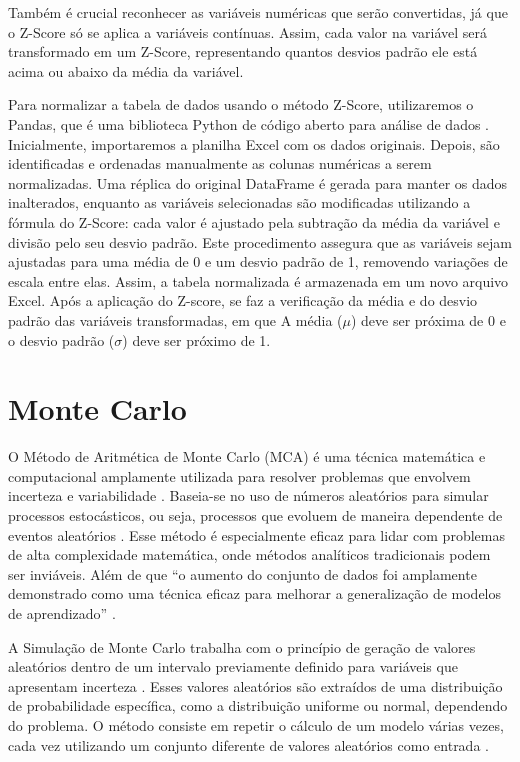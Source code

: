 \begin{apendicesenv}
Também é crucial reconhecer as variáveis numéricas que serão convertidas, já que o Z-Score só se aplica a variáveis contínuas. Assim, cada valor na variável será transformado em um Z-Score, representando quantos desvios padrão ele está acima ou abaixo da média da variável. 

Para normalizar a tabela de dados usando o método Z-Score, utilizaremos o  Pandas, que é uma biblioteca Python de código aberto para análise de dados \cite{chen2018}. Inicialmente, importaremos a planilha Excel com os dados originais. Depois, são identificadas e ordenadas manualmente as colunas numéricas a serem normalizadas. Uma réplica do original DataFrame é gerada para manter os dados inalterados, enquanto as variáveis selecionadas são modificadas utilizando a fórmula do Z-Score: cada valor é ajustado pela subtração da média da variável e divisão pelo seu desvio padrão. Este procedimento assegura que as variáveis sejam ajustadas para uma média de 0 e um desvio padrão de 1, removendo variações de escala entre elas. Assim, a tabela normalizada é armazenada em um novo arquivo Excel. Após a aplicação do Z-score, se faz a verificação da média e do desvio padrão das variáveis transformadas, em que A média (\(\mu\)) deve ser próxima de 0 e o desvio padrão (\(\sigma\))  deve ser próximo de 1.

\chapter{Monte Carlo}
\label{apendice:montecarlo}


O Método de Aritmética de Monte Carlo (MCA) é uma técnica matemática e computacional amplamente utilizada para resolver problemas que envolvem incerteza e variabilidade \cite{kalos2009}. Baseia-se no uso de números aleatórios para simular processos estocásticos, ou seja, processos que evoluem de maneira dependente de eventos aleatórios \cite{kalos2009}. Esse método é especialmente eficaz para lidar com problemas de alta complexidade matemática, onde métodos analíticos tradicionais podem ser inviáveis. Além de que “o aumento do conjunto de dados foi amplamente demonstrado como uma técnica eficaz para melhorar a generalização de modelos de aprendizado” \cite{kiar2021}.

A Simulação de Monte Carlo trabalha com o princípio de geração de valores aleatórios dentro de um intervalo previamente definido para variáveis que apresentam incerteza \cite{kalos2009}. Esses valores aleatórios são extraídos de uma distribuição de probabilidade específica, como a distribuição uniforme ou normal, dependendo do problema. O método consiste em repetir o cálculo de um modelo várias vezes, cada vez utilizando um conjunto diferente de valores aleatórios como entrada \cite{kalos2009}. 


\end{apendicesenv}
